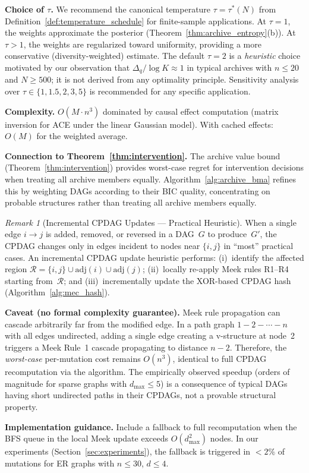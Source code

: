 \documentclass{article}
\theoremstyle{definition}
\theoremstyle{plain}
\theoremstyle{remark}
\newtheorem{remark}{Remark}
\begin{document}
\textbf{Choice of $\tau$.} We recommend the canonical temperature
$\tau = \tau^*(N)$ from Definition~\ref{def:temperature_schedule} for
finite-sample applications. At $\tau = 1$, the weights approximate the
posterior (Theorem~\ref{thm:archive_entropy}(b)). At $\tau > 1$, the
weights are regularized toward uniformity, providing a more conservative
(diversity-weighted) estimate. The default $\tau = 2$ is a
\emph{heuristic} choice motivated by our observation that
$\Delta_q / \log K \approx 1$ in typical archives with $n \leq 20$ and
$N \geq 500$; it is not derived from any optimality principle.
Sensitivity analysis over $\tau \in \{1, 1.5, 2, 3, 5\}$ is recommended
for any specific application.

\textbf{Complexity.} $O(M \cdot n^3)$ dominated by causal effect
computation (matrix inversion for ACE under the linear Gaussian model).
With cached effects: $O(M)$ for the weighted average.

\textbf{Connection to Theorem~\ref{thm:intervention}.} The archive value
bound (Theorem~\ref{thm:intervention}) provides worst-case regret for
intervention decisions when treating all archive members equally.
Algorithm~\ref{alg:archive_bma} refines this by weighting DAGs according
to their BIC quality, concentrating on probable structures rather than
treating all archive members equally.


\begin{remark}[Incremental CPDAG Updates --- Practical Heuristic]
\label{rem:lazy_mec}
When a single edge $i \to j$ is added, removed, or reversed in a DAG~$G$
to produce~$G'$, the CPDAG changes only in edges incident to nodes near
$\{i, j\}$ in ``most'' practical cases. An incremental CPDAG update
heuristic performs: (i)~identify the affected region
$\mathcal{R} = \{i, j\} \cup \mathrm{adj}(i) \cup \mathrm{adj}(j)$;
(ii)~locally re-apply Meek rules R1--R4 \citep{meek1995causal} starting
from~$\mathcal{R}$; and (iii)~incrementally update the XOR-based CPDAG
hash (Algorithm~\ref{alg:mec_hash}).

\textbf{Caveat (no formal complexity guarantee).} Meek rule propagation
can cascade arbitrarily far from the modified edge. In a path graph
$1 - 2 - \cdots - n$ with all edges undirected, adding a single edge
creating a v-structure at node~2 triggers a Meek Rule~1 cascade
propagating to distance $n - 2$. Therefore, the \emph{worst-case}
per-mutation cost remains $O(n^3)$, identical to full CPDAG recomputation
via the \citet{chickering2002optimal} algorithm. The empirically observed
speedup (orders of magnitude for sparse graphs with $d_{\max} \leq 5$)
is a consequence of typical DAGs having short undirected paths in their
CPDAGs, not a provable structural property.

\textbf{Implementation guidance.} Include a fallback to full
recomputation when the BFS queue in the local Meek update exceeds
$O(d_{\max}^2)$ nodes. In our experiments (Section~\ref{sec:experiments}),
the fallback is triggered in $< 2\%$ of mutations for ER graphs with
$n \leq 30$, $d \leq 4$.
\end{remark}
\end{document}
